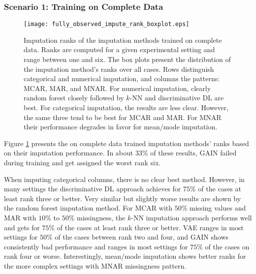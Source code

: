 \subsubsection{Scenario 1: Training on Complete Data}
\label{sec:results_experiment1_scenario1}

\begin{figure}\centering
    \texttt{[image: fully\_observed\_impute\_rank\_boxplot.eps]}
    \caption[Imputation Ranks - Fully Observed]{Imputation ranks of the  imputation methods trained on complete data. Ranks are computed for a given experimental setting and range between one and six. The box plots present the distribution of the imputation method's ranks over all cases. Rows distinguish categorical and numerical imputation, and columns the patterns: MCAR, MAR, and MNAR. For numerical imputation, clearly random forest closely followed by $k$-NN and discriminative DL are best. For categorical imputation, the results are less clear. However, the same three tend to be best for MCAR and MAR. For MNAR their performance degrades in favor for mean/mode imputation.
	}
	\label{fig:fully_observed_impute_rank_boxplot}
\end{figure}


Figure \ref{fig:fully_observed_impute_rank_boxplot} presents the on complete data trained imputation methods' ranks based on their imputation performance. In about $33\%$ of these results, GAIN failed during training and get assigned the worst rank six.

When imputing categorical columns, there is no clear best method. However, in many settings the discriminative DL approach achieves for $75\%$ of the cases at least rank three or better. Very similar but slightly worse results are shown by the random forest imputation method. For MCAR with $50\%$ missing values and MAR with $10\%$ to $50\%$ missingness, the $k$-NN imputation approach performs well and gets for $75\%$ of the cases at least rank three or better. VAE ranges in most settings for $50\%$ of the cases between rank two and four, and GAIN shows consistently bad performance and ranges in most settings for $75\%$ of the cases on rank four or worse. Interestingly, mean/mode imputation shows better ranks for the more complex settings with MNAR missingness pattern.

